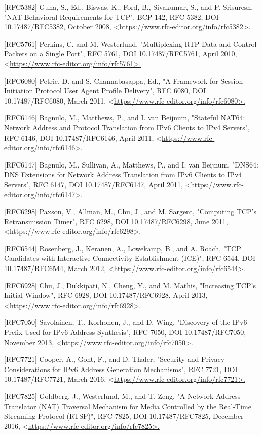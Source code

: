 \documentclass{article}
\begin{document}
[RFC5382]  Guha, S., Ed., Biswas, K., Ford, B., Sivakumar, S., and P. Srisuresh, "NAT Behavioral Requirements for TCP", BCP 142, RFC 5382, DOI 10.17487/RFC5382, October 2008, <\url{https://www.rfc-editor.org/info/rfc5382>.}

[RFC5761]  Perkins, C. and M. Westerlund, "Multiplexing RTP Data and Control Packets on a Single Port", RFC 5761, DOI 10.17487/RFC5761, April 2010, <\url{https://www.rfc-editor.org/info/rfc5761>.}

[RFC6080]  Petrie, D. and S. Channabasappa, Ed., "A Framework for Session Initiation Protocol User Agent Profile Delivery", RFC 6080, DOI 10.17487/RFC6080, March 2011, <\url{https://www.rfc-editor.org/info/rfc6080>.}

[RFC6146]  Bagnulo, M., Matthews, P., and I. van Beijnum, "Stateful NAT64: Network Address and Protocol Translation from IPv6 Clients to IPv4 Servers", RFC 6146, DOI 10.17487/RFC6146, April 2011, <\url{https://www.rfc-editor.org/info/rfc6146>.}

[RFC6147]  Bagnulo, M., Sullivan, A., Matthews, P., and I. van Beijnum, "DNS64: DNS Extensions for Network Address Translation from IPv6 Clients to IPv4 Servers", RFC 6147, DOI 10.17487/RFC6147, April 2011, <\url{https://www.rfc-editor.org/info/rfc6147>.}

[RFC6298]  Paxson, V., Allman, M., Chu, J., and M. Sargent, "Computing TCP's Retransmission Timer", RFC 6298, DOI 10.17487/RFC6298, June 2011, <\url{https://www.rfc-editor.org/info/rfc6298>.}

[RFC6544]  Rosenberg, J., Keranen, A., Lowekamp, B., and A. Roach, "TCP Candidates with Interactive Connectivity Establishment (ICE)", RFC 6544, DOI 10.17487/RFC6544, March 2012, <\url{https://www.rfc-editor.org/info/rfc6544>.}

[RFC6928]  Chu, J., Dukkipati, N., Cheng, Y., and M. Mathis, "Increasing TCP's Initial Window", RFC 6928, DOI 10.17487/RFC6928, April 2013, <\url{https://www.rfc-editor.org/info/rfc6928>.}

[RFC7050]  Savolainen, T., Korhonen, J., and D. Wing, "Discovery of the IPv6 Prefix Used for IPv6 Address Synthesis", RFC 7050, DOI 10.17487/RFC7050, November 2013, <\url{https://www.rfc-editor.org/info/rfc7050>.}

[RFC7721]  Cooper, A., Gont, F., and D. Thaler, "Security and Privacy Considerations for IPv6 Address Generation Mechanisms", RFC 7721, DOI 10.17487/RFC7721, March 2016, <\url{https://www.rfc-editor.org/info/rfc7721>.}

[RFC7825]  Goldberg, J., Westerlund, M., and T. Zeng, "A Network Address Translator (NAT) Traversal Mechanism for Media Controlled by the Real-Time Streaming Protocol (RTSP)", RFC 7825, DOI 10.17487/RFC7825, December 2016, <\url{https://www.rfc-editor.org/info/rfc7825>.}
\end{document}
